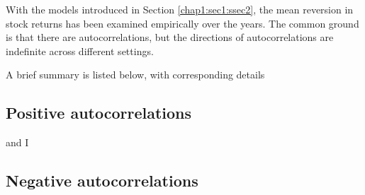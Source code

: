 With the models introduced in Section \ref{chap1:sec1:ssec2}, the mean reversion in stock returns
has been examined empirically over the years. The common ground is that there are autocorrelations,
but the directions of autocorrelations are indefinite across different settings.

A brief summary is listed below, with corresponding details 

\subsection{Positive autocorrelations}
and I 

\subsection{Negative autocorrelations}


